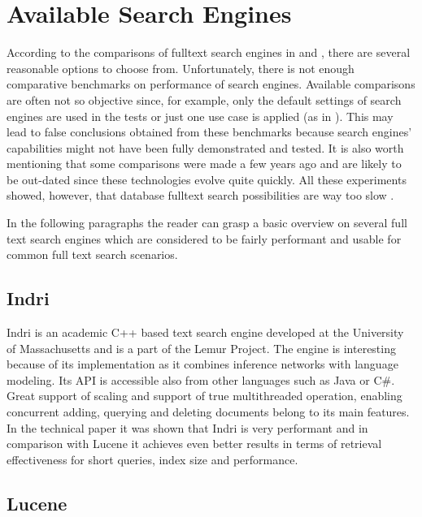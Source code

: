\chapter{Available Search Engines}

According to the comparisons of fulltext search engines in \cite{MiddletonBaeza}
and \cite{SinghSearchEngines}, there are several reasonable options
to choose from. Unfortunately, there is not enough comparative benchmarks
on performance of search engines. Available comparisons are often
not so objective since, for example, only the default settings of
search engines are used in the tests or just one use case is applied
(as in \cite{SinghSearchEngines}). This may lead to false conclusions
obtained from these benchmarks because search engines' capabilities
might not have been fully demonstrated and tested. It is also worth
mentioning that some comparisons were made a few years ago and are
likely to be out-dated since these technologies evolve quite quickly.
All these experiments showed, however, that database fulltext search
possibilities are way too slow \cite{BenchmarkLuceneRelDB,BenchmarkMysqlLuceneSphinx}.

In the following paragraphs the reader can grasp a basic overview
on several full text search engines which are considered to be fairly
performant and usable for common full text search scenarios.


\section{Indri}

Indri \cite{IndriHome} is an academic C++ based text search engine
developed at the University of Massachusetts and is a part of the
Lemur Project. The engine is interesting because of its implementation
as it combines inference networks with language modeling. Its API
is accessible also from other languages such as Java or C\#. Great
support of scaling and support of true multithreaded operation, enabling
concurrent adding, querying and deleting documents belong to its main
features. In the technical paper \cite{ComparisonLuceneIndri}
it was shown that Indri is very performant and in comparison with
Lucene it achieves even better results in terms of retrieval effectiveness
for short queries, index size and performance.


\section{Lucene}

